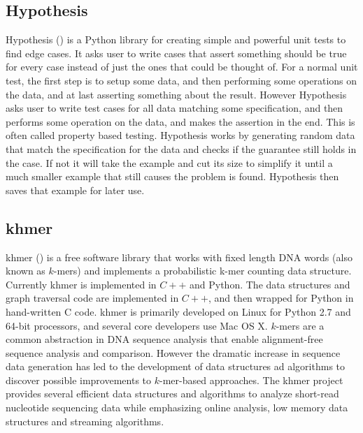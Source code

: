 \documentclass[preprint,nocopyrightspace]{sig-alternate}
\begin{document}
\subsection{Hypothesis}
Hypothesis (\citet{maciver_welcome_2015}) is a Python library for creating simple and powerful unit tests to find edge cases.
It asks user to write cases that assert something should be true for every case instead of just the ones that could be thought of.
For a normal unit test,
the first step is to setup some data,
and then performing some operations on the data,
and at last asserting something about the result.
However Hypothesis asks user to write test cases for all data matching some specification,
and then performs some operation on the data,
and makes the assertion in the end.
This is often called property based testing.
Hypothesis works by generating random data that match the specification for the data and checks if the guarantee still holds in the case.
If not it will take the example and cut its size to simplify it until a much smaller example that still causes the problem is found.
Hypothesis then saves that example for later use.

\subsection{khmer}
khmer (\citet{crusoe_khmer_2015}) is a free software library that works with fixed length DNA words (also known as $k$-mers) and implements a probabilistic k-mer counting data structure.
Currently khmer is implemented in $C++$ and Python.
The data structures and graph traversal code are implemented in $C++$,
and then wrapped for Python in hand-written C code.
khmer is primarily developed on Linux for Python 2.7 and 64-bit processors,
and several core developers use Mac OS X.
$k$-mers are a common abstraction in DNA sequence analysis that enable alignment-free sequence analysis and comparison.
However the dramatic increase in sequence data generation has led to the development of data structures ad algorithms to discover possible improvements to $k$-mer-based approaches.
The khmer project provides several efficient data structures and algorithms to analyze short-read nucleotide sequencing data while emphasizing online analysis,
low memory data structures and streaming algorithms.
\end{document}
